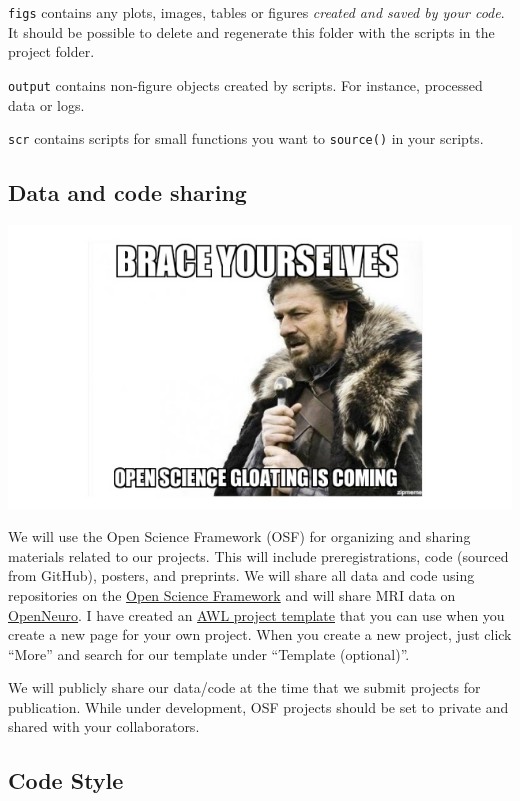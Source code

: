 \documentclass[]{book}
\begin{document}
\texttt{figs} contains any plots, images, tables or figures \emph{created and saved by your code}. It should be possible to delete and regenerate this folder with the scripts in the project folder.

\texttt{output} contains non-figure objects created by scripts. For instance, processed data or logs.

\texttt{scr} contains scripts for small functions you want to \texttt{source()} in your scripts.

\hypertarget{data-and-code-sharing}{%
\subsection{Data and code sharing}\label{data-and-code-sharing}}

\includegraphics{images/open_science.jpg}

We will use the Open Science Framework (OSF) for organizing and sharing materials related to our projects. This will include preregistrations, code (sourced from GitHub), posters, and preprints. We will share all data and code using repositories on the \href{https://osf.io/}{Open Science Framework} and will share MRI data on \href{https://openneuro.org/}{OpenNeuro}. I have created an \href{https://osf.io/ce8p4/}{AWL project template} that you can use when you create a new page for your own project. When you create a new project, just click ``More'' and search for our template under ``Template (optional)''.

We will publicly share our data/code at the time that we submit projects for publication. While under development, OSF projects should be set to private and shared with your collaborators.

\hypertarget{code-style}{%
\subsection{Code Style}\label{code-style}}
\end{document}
